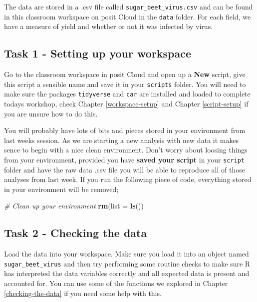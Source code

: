 \documentclass[
]{book}
\newenvironment{Shaded}{\begin{snugshade}}{\end{snugshade}}
\newcommand{\AttributeTok}[1]{\textcolor[rgb]{0.13,0.29,0.53}{#1}}
\newcommand{\CommentTok}[1]{\textcolor[rgb]{0.56,0.35,0.01}{\textit{#1}}}
\newcommand{\FunctionTok}[1]{\textcolor[rgb]{0.13,0.29,0.53}{\textbf{#1}}}
\newcommand{\NormalTok}[1]{#1}
\begin{document}
The data are stored in a .csv file called \texttt{sugar\_beet\_virus.csv} and can be found in this classroom workspace on posit Cloud in the \texttt{data} folder. For each field, we have a measure of yield and whether or not it was infected by virus.

\hypertarget{task-1---setting-up-your-workspace}{%
\subsection{Task 1 - Setting up your workspace}\label{task-1---setting-up-your-workspace}}

Go to the classroom workspace in posit Cloud and open up a \textbf{New} script, give this script a sensible name and save it in your \texttt{scripts} folder. You will need to make sure the packages \texttt{tidyverse} and \texttt{car} are installed and loaded to complete todays workshop, check Chapter \ref{workspace-setup} and Chapter \ref{script-setup} if you are unsure how to do this.

You will probably have lots of bits and pieces stored in your environment from last weeks session. As we are starting a new analysis with new data it makes sence to begin with a nice clean environment. Don't worry about loosing things from your environment, provided you have \textbf{saved your script} in your \texttt{script} folder and have the raw data .csv file you will be able to reproduce all of those analyses from last week. If you run the following piece of code, everything stored in your environment will be removed;

\begin{Shaded}
\begin{Highlighting}[]
\CommentTok{\# Clean up your environment}
\FunctionTok{rm}\NormalTok{(}\AttributeTok{list =} \FunctionTok{ls}\NormalTok{())}
\end{Highlighting}
\end{Shaded}

\hypertarget{task-2---checking-the-data}{%
\subsection{Task 2 - Checking the data}\label{task-2---checking-the-data}}

Load the data into your workspace. Make sure you load it into an object named \texttt{sugar\_beet\_virus} and then try performing some routine checks to make sure R has interpreted the data variables correctly and all expected data is present and accounted for. You can use some of the functions we explored in Chapter \ref{checking-the-data} if you need some help with this.
\end{document}
